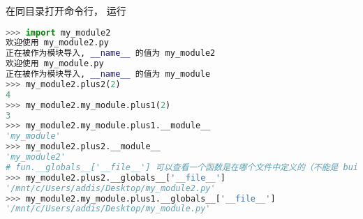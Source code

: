 在同目录打开命令行， 运行
\begin{lstlisting}[language=python]
>>> import my_module2
欢迎使用 my_module2.py
正在被作为模块导入, __name__ 的值为 my_module2
欢迎使用 my_module.py
正在被作为模块导入, __name__ 的值为 my_module
>>> my_module2.plus2(2)
4
>>> my_module2.my_module.plus1(2)
3
>>> my_module2.my_module.plus1.__module__
'my_module'
>>> my_module2.plus2.__module__
'my_module2'
# fun.__globals__['__file__'] 可以查看一个函数是在哪个文件中定义的（不能是 builtin 函数）。
>>> my_module2.plus2.__globals__['__file__']
'/mnt/c/Users/addis/Desktop/my_module2.py'
>>> my_module2.my_module.plus1.__globals__['__file__']
'/mnt/c/Users/addis/Desktop/my_module.py'
\end{lstlisting}
